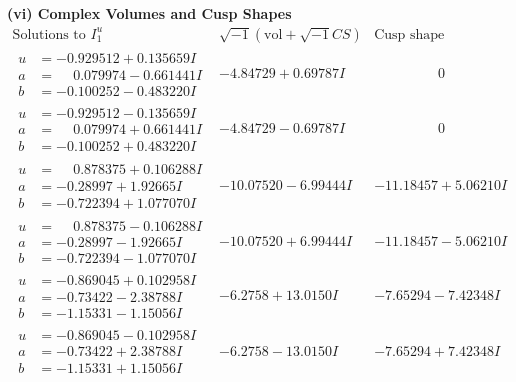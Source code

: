 \documentclass[1p]{elsarticle_modified}
\theoremstyle{definition}
\newcommand{\I}{\sqrt{-1}}
\begin{document}
\newpage\flushleft \textbf{(vi) Complex Volumes and Cusp Shapes}
$$\begin{array}{c|c|c}  
\text{Solutions to }I^u_{1}& \I (\text{vol} + \sqrt{-1}CS) & \text{Cusp shape}\\
 \hline 
\begin{aligned}
u &= -0.929512 + 0.135659 I \\
a &= \phantom{-}0.079974 - 0.661441 I \\
b &= -0.100252 - 0.483220 I\end{aligned}
 & -4.84729 + 0.69787 I & \phantom{-0.000000 } 0 \\ \hline\begin{aligned}
u &= -0.929512 - 0.135659 I \\
a &= \phantom{-}0.079974 + 0.661441 I \\
b &= -0.100252 + 0.483220 I\end{aligned}
 & -4.84729 - 0.69787 I & \phantom{-0.000000 } 0 \\ \hline\begin{aligned}
u &= \phantom{-}0.878375 + 0.106288 I \\
a &= -0.28997 + 1.92665 I \\
b &= -0.722394 + 1.077070 I\end{aligned}
 & -10.07520 - 6.99444 I & -11.18457 + 5.06210 I \\ \hline\begin{aligned}
u &= \phantom{-}0.878375 - 0.106288 I \\
a &= -0.28997 - 1.92665 I \\
b &= -0.722394 - 1.077070 I\end{aligned}
 & -10.07520 + 6.99444 I & -11.18457 - 5.06210 I \\ \hline\begin{aligned}
u &= -0.869045 + 0.102958 I \\
a &= -0.73422 - 2.38788 I \\
b &= -1.15331 - 1.15056 I\end{aligned}
 & -6.2758 + 13.0150 I & -7.65294 - 7.42348 I \\ \hline\begin{aligned}
u &= -0.869045 - 0.102958 I \\
a &= -0.73422 + 2.38788 I \\
b &= -1.15331 + 1.15056 I\end{aligned}
 & -6.2758 - 13.0150 I & -7.65294 + 7.42348 I \\ \hline\begin{aligned}

\end{aligned}
\end{array}$$
\end{document}
